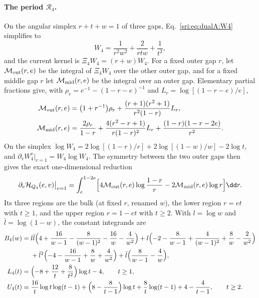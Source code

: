 \paragraph{The period $\mathcal R_4$.} On the angular simplex $r+t+w=1$ of three gaps, Eq.~\eqref{sri:eq:dualA:W4}
simplifies to
\begin{equation}
 W_4=\frac1{r^2w^2}+\frac2{rtw}+\frac1{t^2},
 \label{sri:eq:dualB:W4decomp}
\end{equation}
and the current kernel is $\Xi_4W_4=(r+w)W_4$. For a fixed outer gap $r$, let $\mathcal M_{\rm out}(r,e)$ be the
integral of $\Xi_4W_4$ over the other outer gap, and for a fixed middle gap $r$ let $\mathcal M_{\rm mid}(r,e)$ be the
integral over an outer gap. Elementary partial fractions give, with $\rho_r=e^{-1}-(1-r-e)^{-1}$ and
$L_r=\log[(1-r-e)/e]$,
\begin{equation}
\begin{aligned}
 \mathcal M_{\rm out}(r,e)&=\bigl(1+r^{-1}\bigr)\rho_r+\frac{(r+1)(r^2+1)}{r^2(1-r)}L_r,\\
 \mathcal M_{\rm mid}(r,e)&=\frac{2\rho_r}{1-r}+\frac{4(r^2-r+1)}{r(1-r)^2}L_r+\frac{(1-r)(1-r-2e)}{r^2}.
\end{aligned}
\label{sri:eq:dualB:Mout}
\end{equation}
On the simplex $\log W_4=2\log[(1-r)/r]+2\log[(1-w)/w]-2\log t$, and $\partial_vW_4^v|_{v=1}=W_4\log W_4$. The symmetry
between the two outer gaps then gives the exact one-dimensional reduction
\begin{equation}
 \partial_v\mathcal H_{Q_4}(e,v)\big|_{v=1}=\int_e^{1-2e}\Bigl[4\mathcal M_{\rm out}(r,e)\log\frac{1-r}{r}
 -2\mathcal M_{\rm mid}(r,e)\log r\Bigr]\dd r.
 \label{sri:eq:dualB:Hprime}
\end{equation}
Its three regions are the bulk (at fixed $r$, renamed $w$), the lower region $r=et$ with $t\ge1$, and the upper region
$r=1-et$ with $t\ge2$. With $l=\log w$ and $\bar l=\log(1-w)$, the constant integrands are
\begin{align}
 B_4(w)={}&l\bar l\Bigl(4+\frac{16}{w-1}-\frac8{(w-1)^2}-\frac{16}{w}-\frac4{w^2}\Bigr)
 +l\Bigl(-2-\frac8{w-1}+\frac4{(w-1)^2}+\frac8w-\frac2{w^2}\Bigr)\notag\\
 &+\bar l^2\Bigl(-4-\frac{16}{w-1}+\frac8w+\frac4{w^2}\Bigr)+\bar l\Bigl(\frac8{w-1}-\frac4w\Bigr),\label{sri:eq:dualB:B4}\\
 L_4(t)={}&\Bigl(-8+\frac{12}{t}+\frac8{t^2}\Bigr)\log t-4,\qquad t\ge1,\\
 U_4(t)={}&\frac{16}{t}\log t\log(t-1)+\Bigl(8-\frac8{t-1}\Bigr)\log t+\frac8t\log(t-1)+4-\frac4{t-1},\qquad t\ge2.
\end{align}
